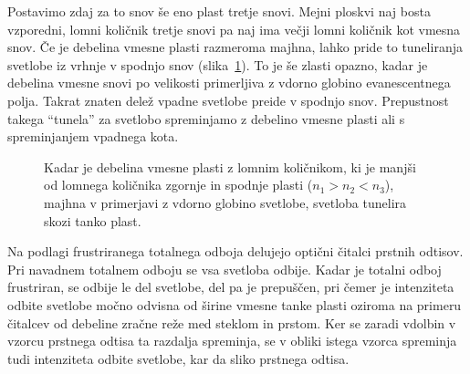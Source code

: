Postavimo zdaj za to snov še eno plast tretje snovi. Mejni ploskvi naj bosta vzporedni, lomni 
količnik tretje snovi pa naj ima večji lomni količnik kot vmesna snov. Če je debelina
vmesne plasti razmeroma majhna, lahko pride to tuneliranja svetlobe iz vrhnje v spodnjo snov
(slika~\ref{fig:04_tunel}). To je še zlasti opazno, kadar je debelina vmesne snovi po 
velikosti primerljiva z vdorno globino evanescentnega polja. Takrat
znaten delež vpadne svetlobe preide v spodnjo snov. Prepustnost takega ``tunela'' za svetlobo 
spreminjamo z debelino vmesne plasti ali s spreminjanjem vpadnega kota.
\begin{figure}[ht]
\centering
\def\svgwidth{60truemm} 

\caption{Kadar je debelina vmesne plasti z lomnim količnikom, ki je manjši od lomnega količnika
zgornje in spodnje plasti ($n_1>n_2<n_3$), majhna v primerjavi z vdorno globino svetlobe, 
svetloba tunelira skozi tanko plast. }
\label{fig:04_tunel}
\end{figure}
\begin{remark}
Na podlagi frustriranega totalnega odboja delujejo optični čitalci prstnih odtisov. Pri 
navadnem totalnem odboju se vsa svetloba odbije. Kadar je totalni odboj frustriran, se 
odbije le del svetlobe, del pa je prepuščen, pri čemer je intenziteta odbite
svetlobe močno odvisna od širine vmesne tanke plasti oziroma na primeru čitalcev 
od debeline zračne reže med steklom in prstom. Ker se zaradi vdolbin v vzorcu prstnega odtisa
ta razdalja spreminja, se v obliki istega vzorca spreminja tudi intenziteta odbite svetlobe,
kar da sliko prstnega odtisa. 
\end{remark} 

